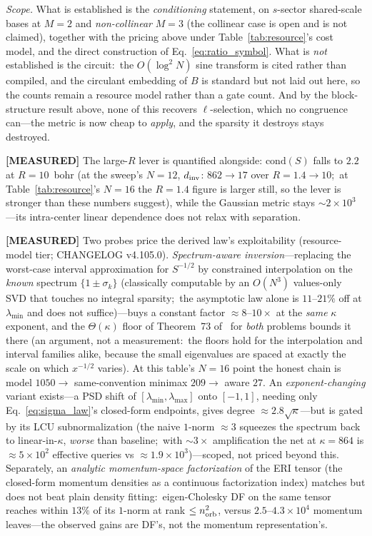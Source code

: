 \documentclass[aps,pra,twocolumn,superscriptaddress,longbibliography]{revtex4-2}
\begin{document}
\emph{Scope.} What is established is the \emph{conditioning} statement, on
$s$-sector shared-scale bases at $M=2$ and \emph{non-collinear} $M=3$ (the
collinear case is open and is not claimed), together with the pricing
above under Table~\ref{tab:resource}'s cost model, and the direct construction
of Eq.~\eqref{eq:ratio_symbol}.  What is \emph{not} established is the circuit:\
the $O(\log^2N)$ sine transform is cited rather than compiled, and the
circulant embedding of $B$ is standard but not laid out here, so the counts
remain a resource model rather than a gate count.  And by the block-structure
result above, none of this recovers $\ell$-selection, which no congruence
can---the metric is now cheap to \emph{apply}, and the sparsity it destroys
stays destroyed.

\textbf{[MEASURED]} The large-$R$ lever is quantified alongside: $\mathrm{cond}(S)$ falls to
$2.2$ at $R=10$~bohr (at the sweep's $N=12$, $d_{\rm inv}$: $862\to17$ over
$R=1.4\to10$;\ at Table~\ref{tab:resource}'s $N=16$ the $R=1.4$ figure is
larger still, so the lever is stronger than these numbers suggest), while the Gaussian metric
stays $\sim\!2\times10^3$---its intra-center linear dependence does not relax with separation.

\textbf{[MEASURED]} Two probes price the derived law's exploitability (resource-model tier;
CHANGELOG v4.105.0).  \emph{Spectrum-aware inversion}---replacing the worst-case interval
approximation for $S^{-1/2}$ by constrained interpolation on the \emph{known} spectrum
$\{1\pm\sigma_k\}$ (classically computable by an $O(N^3)$ values-only SVD that touches no
integral sparsity;\ the asymptotic law alone is $11$--$21\%$ off at $\lambda_{\min}$ and does
not suffice)---buys a constant factor $\approx8$--$10\times$ at the \emph{same} $\kappa$
exponent, and the $\Theta(\kappa)$ floor of Theorem~73 of~\cite{gslw2019} for
\emph{both} problems
bounds it there (an argument, not a measurement:\ the floors hold for the
interpolation and interval families alike,
because the small eigenvalues are spaced at exactly the scale on which $x^{-1/2}$ varies).  At
this table's $N=16$ point the honest chain is model $1050\to$ same-convention minimax
$209\to$ aware $27$.  An \emph{exponent-changing} variant exists---a PSD shift of
$[\lambda_{\min},\lambda_{\max}]$ onto $[-1,1]$, needing only Eq.~\eqref{eq:sigma_law}'s
closed-form endpoints, gives degree $\approx2.8\sqrt\kappa$---but is gated by its LCU
subnormalization (the naive $1$-norm $\approx3$ squeezes the spectrum back to
linear-in-$\kappa$, \emph{worse} than baseline;\ with $\sim\!3\times$ amplification the net at
$\kappa=864$ is $\approx5\times10^2$ effective queries vs $\approx1.9\times10^3$)---scoped, not
priced beyond this.  Separately, an \emph{analytic momentum-space factorization} of the ERI
tensor (the closed-form momentum densities as a continuous factorization index) matches but
does not beat plain density fitting:\ eigen-Cholesky DF on the same tensor reaches within
$13\%$ of its $1$-norm at rank $\le n_{\rm orb}^2$, versus $2.5$--$4.3\times10^4$ momentum
leaves---the observed gains are DF's, not the momentum representation's.
\end{document}
